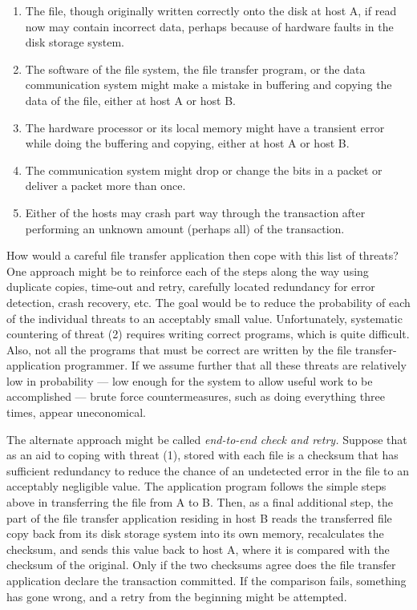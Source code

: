 \documentclass[a4paper,12pt,notitlepage,twoside,openright]{article}
\begin{document}
\begin{enumerate}[label=(\arabic*)]
\item

  The file, though originally written correctly onto the disk at host A,
  if read now may contain incorrect data, perhaps because of hardware
  faults in the disk storage system.

\item

  The software of the file system, the file transfer program, or the
  data communication system might make a mistake in buffering and
  copying the data of the file, either at host A or host B.

\item

  The hardware processor or its local memory might have a transient
  error while doing the buffering and copying, either at host A or host
  B.

\item

  The communication system might drop or change the bits in a packet or
  deliver a packet more than once.

\item

  Either of the hosts may crash part way through the transaction after
  performing an unknown amount (perhaps all) of the transaction.

\end{enumerate}

How would a careful file transfer application then cope with this list
of threats? One approach might be to reinforce each of the steps along
the way using duplicate copies, time-out and retry, carefully located
redundancy for error detection, crash recovery, etc. The goal would be
to reduce the probability of each of the individual threats to an
acceptably small value. Unfortunately, systematic countering of threat
(2) requires writing correct programs, which is quite difficult. Also,
not all the programs that must be correct are written by the file
transfer-application programmer. If we assume further that all these
threats are relatively low in probability --- low enough for the system
to allow useful work to be accomplished --- brute force
countermeasures, such as doing everything three times, appear
uneconomical.


The alternate approach might be called \emph{end-to-end check and
retry.} Suppose that as an aid to coping with threat (1), stored with
each file is a checksum that has sufficient redundancy to reduce the
chance of an undetected error in the file to an acceptably negligible
value. The application program follows the simple steps above in
transferring the file from A to B. Then, as a final additional step, the
part of the file transfer application residing in host B reads the
transferred file copy back from its disk storage system into its own
memory, recalculates the checksum, and sends this value back to host A,
where it is compared with the checksum of the original. Only if the two
checksums agree does the file transfer application declare the
transaction committed. If the comparison fails, something has gone
wrong, and a retry from the beginning might be attempted.
\end{document}
